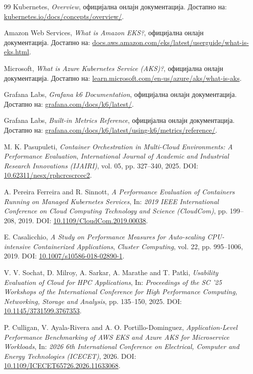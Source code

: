 \documentclass{article}
\begin{document}
\begin{thebibliography}{99}
Kubernetes,
\textit{Overview},
официјална онлајн документација. Достапно на: \href{https://kubernetes.io/docs/concepts/overview/}{kubernetes.io/docs/concepts/overview/}.

Amazon Web Services,
\textit{What is Amazon EKS?},
официјална онлајн документација. Достапно на: \href{https://docs.aws.amazon.com/eks/latest/userguide/what-is-eks.html}{docs.aws.amazon.com/eks/latest/userguide/what-is-eks.html}.

Microsoft,
\textit{What is Azure Kubernetes Service (AKS)?},
официјална онлајн документација. Достапно на: \href{https://learn.microsoft.com/en-us/azure/aks/what-is-aks}{learn.microsoft.com/en-us/azure/aks/what-is-aks}.

Grafana Labs,
\textit{Grafana k6 Documentation},
официјална онлајн документација. Достапно на: \href{https://grafana.com/docs/k6/latest/}{grafana.com/docs/k6/latest/}.

Grafana Labs,
\textit{Built-in Metrics Reference},
официјална онлајн документација. Достапно на: \href{https://grafana.com/docs/k6/latest/using-k6/metrics/reference/}{grafana.com/docs/k6/latest/using-k6/metrics/reference/}.

M. K. Pasupuleti,
\textit{Container Orchestration in Multi-Cloud Environments: A Performance Evaluation},
\textit{International Journal of Academic and Industrial Research Innovations (IJAIRI)}, vol. 05, pp. 327--340, 2025. DOI: \href{https://doi.org/10.62311/nesx/rphcrcscrcec2}{10.62311/nesx/rphcrcscrcec2}.

A. Pereira Ferreira and R. Sinnott,
\textit{A Performance Evaluation of Containers Running on Managed Kubernetes Services},
In: \textit{2019 IEEE International Conference on Cloud Computing Technology and Science (CloudCom)}, pp. 199--208, 2019. DOI: \href{https://doi.org/10.1109/CloudCom.2019.00038}{10.1109/CloudCom.2019.00038}.

E. Casalicchio,
\textit{A Study on Performance Measures for Auto-scaling CPU-intensive Containerized Applications},
\textit{Cluster Computing}, vol. 22, pp. 995--1006, 2019. DOI: \href{https://doi.org/10.1007/s10586-018-02890-1}{10.1007/s10586-018-02890-1}.

V. V. Sochat, D. Milroy, A. Sarkar, A. Marathe and T. Patki,
\textit{Usability Evaluation of Cloud for HPC Applications},
In: \textit{Proceedings of the SC '25 Workshops of the International Conference for High Performance Computing, Networking, Storage and Analysis}, pp. 135--150, 2025. DOI: \href{https://doi.org/10.1145/3731599.3767353}{10.1145/3731599.3767353}.

P. Culligan, V. Ayala-Rivera and A. O. Portillo-Dominguez,
\textit{Application-Level Performance Benchmarking of AWS EKS and Azure AKS for Microservice Workloads},
In: \textit{2026 6th International Conference on Electrical, Computer and Energy Technologies (ICECET)}, 2026. DOI: \href{https://doi.org/10.1109/ICECET65726.2026.11633068}{10.1109/ICECET65726.2026.11633068}.
\end{thebibliography}
\end{document}
